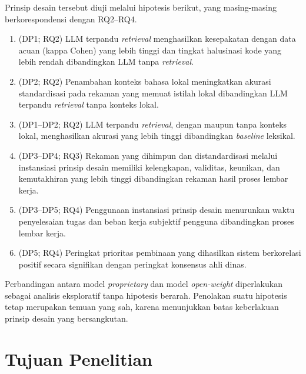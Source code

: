 \documentclass[12pt,a4paper]{report}
\begin{document}
Prinsip desain tersebut diuji melalui hipotesis berikut, yang masing-masing berkorespondensi dengan RQ2--RQ4.
\begin{enumerate}[label=\textbf{H\arabic*}:, leftmargin=*]
  \item (DP1; RQ2) LLM terpandu \textit{retrieval} menghasilkan kesepakatan dengan data acuan (kappa Cohen) yang lebih tinggi dan tingkat halusinasi kode yang lebih rendah dibandingkan LLM tanpa \textit{retrieval}.
  \item (DP2; RQ2) Penambahan konteks bahasa lokal meningkatkan akurasi standardisasi pada rekaman yang memuat istilah lokal dibandingkan LLM terpandu \textit{retrieval} tanpa konteks lokal.
  \item (DP1--DP2; RQ2) LLM terpandu \textit{retrieval}, dengan maupun tanpa konteks lokal, menghasilkan akurasi yang lebih tinggi dibandingkan \textit{baseline} leksikal.
  \item (DP3--DP4; RQ3) Rekaman yang dihimpun dan distandardisasi melalui instansiasi prinsip desain memiliki kelengkapan, validitas, keunikan, dan kemutakhiran yang lebih tinggi dibandingkan rekaman hasil proses lembar kerja.
  \item (DP3--DP5; RQ4) Penggunaan instansiasi prinsip desain menurunkan waktu penyelesaian tugas dan beban kerja subjektif pengguna dibandingkan proses lembar kerja.
  \item (DP5; RQ4) Peringkat prioritas pembinaan yang dihasilkan sistem berkorelasi positif secara signifikan dengan peringkat konsensus ahli dinas.
\end{enumerate}
Perbandingan antara model \textit{proprietary} dan model \textit{open-weight} diperlakukan sebagai analisis eksploratif tanpa hipotesis berarah. Penolakan suatu hipotesis tetap merupakan temuan yang sah, karena menunjukkan batas keberlakuan prinsip desain yang bersangkutan.

\section{Tujuan Penelitian}
\label{sec:tujuan}
\end{document}
